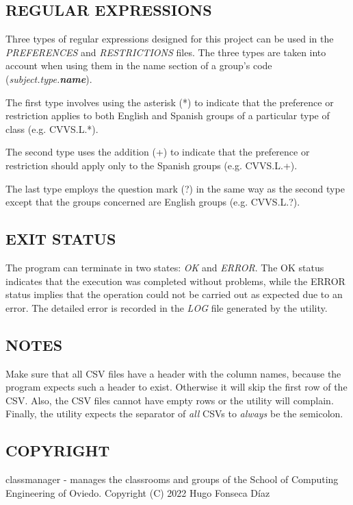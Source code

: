 \subsection*{REGULAR EXPRESSIONS}

Three types of regular expressions designed for this project can be used in the \textit{PREFERENCES} and \textit{RESTRICTIONS} files. The three types are taken into account when using them in the name section of a group's code (\textit{subject.type.\textbf{name}}).

The first type involves using the asterisk (*) to indicate that the preference or restriction applies to both English and Spanish groups of a particular type of class (e.g. CVVS.L.*).

The second type uses the addition (+) to indicate that the preference or restriction should apply only to the Spanish groups (e.g. CVVS.L.+).

The last type employs the question mark (?) in the same way as the second type except that the groups concerned are English groups (e.g. CVVS.L.?).


\subsection*{EXIT STATUS}

The program can terminate in two states: \textit{OK} and \textit{ERROR}. The OK status indicates that the execution was completed without problems, while the ERROR status implies that the operation could not be carried out as expected due to an error. The detailed error is recorded in the \textit{LOG} file generated by the utility.


\subsection*{NOTES}

Make sure that all CSV files have a header with the column names, because the program expects such a header to exist. Otherwise it will skip the first row of the CSV. Also, the CSV files cannot have empty rows or the utility will complain. Finally, the utility expects the separator of \textit{all} CSVs to \textit{always} be the semicolon.


\subsection*{COPYRIGHT}

classmanager - manages the classrooms and groups of the School of Computing Engineering of Oviedo.
Copyright (C) 2022  Hugo Fonseca Díaz

